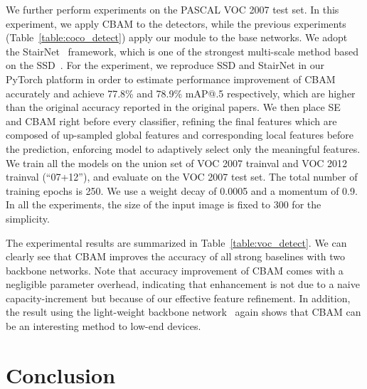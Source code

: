 \documentclass[runningheads]{llncs}
\newcommand{\tabref}[1]{Table~\ref{#1}}
\begin{document}
We further perform experiments on the PASCAL VOC 2007 test set. In this experiment, we apply CBAM to the detectors, while the previous experiments (\tabref{table:coco_detect}) apply our module to the base networks. We adopt the StairNet~\cite{woo2017stairnet} framework, which is one of the strongest multi-scale method based on the SSD~\cite{liu2016ssd}. For the experiment, we reproduce SSD and StairNet in our PyTorch platform in order to estimate performance improvement of CBAM accurately and achieve 77.8\% and 78.9\% mAP@.5 respectively, which are higher than the original accuracy reported in the original papers. We then place SE~\cite{hu2017squeeze} and CBAM right before every classifier, refining the final features which are composed of up-sampled global features and corresponding local features before the prediction, enforcing model to adaptively select only the meaningful features. We train all the models on the union set of VOC 2007 trainval and VOC 2012 trainval (``07+12''), and evaluate on the VOC 2007 test set. The total number of training epochs is 250. We use a weight decay of 0.0005 and a momentum of 0.9.
In all the experiments, the size of the input image is fixed to 300 for the simplicity. 

The experimental results are summarized in \tabref{table:voc_detect}. We can clearly see that CBAM improves the accuracy of all strong baselines with two backbone networks. Note that accuracy improvement of CBAM comes with a negligible parameter overhead, indicating that enhancement is not due to a naive capacity-increment but because of our effective feature refinement. In addition, the result using the light-weight backbone network~\cite{howard2017mobilenets} again shows that CBAM can be an interesting method to low-end devices.

\section{Conclusion}
\end{document}
